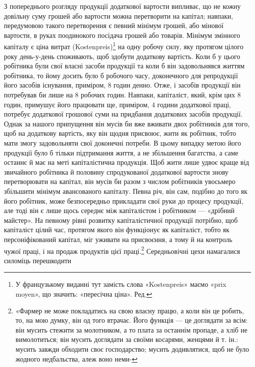 З попереднього розгляду продукції додаткової вартости випливає,
що не кожну довільну суму грошей або вартости можна
перетворити на капітал; навпаки, передумовою такого перетворення
є певний мінімум грошей, або мінової вартости, в руках
поодинокого посідача грошей або товарів. Мінімум змінного капіталу
є ціна витрат (Kostenpreis)\footnote*{
У французькому виданні тут замість слова «Kostenpreis» маємо
«prix moyen», що значить: «пересічна ціна». Ред.
} на одну робочу силу, яку протягом
цілого року день-у-день споживають, щоб здобути додаткову
вартість. Коли б у цього робітника були свої власні засоби
продукції та коли б він задовольнявся життям робітника,
то йому досить було б робочого часу, доконечного для репродукції
його засобів існування, приміром, 8 годин денно. Отже, і
засобів продукції він потребував би лише на 8 робочих годин.
Навпаки, капіталіст, який, крім цих 8 годин, примушує його
працювати ще, приміром, 4 години додаткової праці, потребує
додаткової грошової суми на придбання додаткових засобів продукції.
Однак за нашого припущення він мусів би вже вживати
двох робітників для того, щоб на додаткову вартість, яку він
щодня присвоює, жити як робітник, тобто мати змогу задовольняти
свої доконечні потреби. В цьому випадку метою його продукції
було б тільки підтримання життя, а не збільшення багатства,
а саме останнє й має на меті капіталістична продукція.
Щоб жити лише удвоє краще від звичайного робітника й половину
спродукованої додаткової вартости знову перетворювати
на капітал, він мусів би разом з числом робітників увосьмеро
збільшити мінімум авансованого капіталу. Певна річ, він сам,
подібно до того як його робітник, може безпосередньо прикладати
свої руки до процесу продукції, але тоді він є лише щось середнє
між капіталістом і робітником — «дрібний майстер». На певному
рівні розвитку капіталістичної продукції потрібно, щоб капіталіст
цілий час, протягом якого він функціонує як капіталіст,
тобто як персоніфікований капітал, міг уживати на присвоєння,
а тому й на контроль чужої праці, і на продаж продуктів цієї
праці.\footnote{
«Фармер не може покладатись на свою власну працю, а коли
він це робить, то, на мою думку, він од того втрачає. Його функція — це
доглядати за всім: він мусить стежити за молотником, а то плата за останнім
пропаде, а хліб не вимолотиться; він мусить доглядати за своїми
косарями, женцями й т. ін.: мусить завжди обходити своє господарство;
мусить додивлятися, щоб не було жодного недбальства, алеж воно неми-
} Середньовічні цехи намагалися силоміць перешкодити


